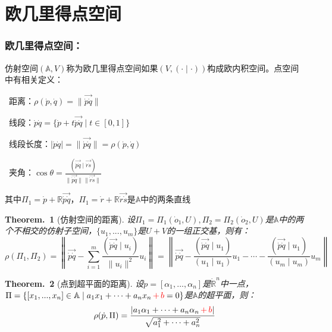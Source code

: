 \documentclass[zihao=5,UTF8]{report}
\def\R{\mathbb{R}}
\def\A{\mathbb{A}}
\theoremstyle{mystyle} %
\newtheorem{theorem}{Theorem.\,}
\begin{document}
\section{欧几里得点空间}

\subsubsection{欧几里得点空间：}
仿射空间$(\A,V)$称为欧几里得点空间如果$(V,(\cdot\mid\cdot))$构成欧内积空间。点空间中有相关定义：
\par{}\ 距离：$\rho(\dot{p}, \dot{q}) = \|\overrightarrow{\dot{p}\dot{q}}\|$    \par
{}\  线段：$\dot{p}\dot{q} = \{\dot{p} + t\overrightarrow{\dot{p}\dot{q}}\mid t \in [0,1]\}$   \par
{}\  线段长度：$|\dot{p}\dot{q}| =\|\overrightarrow{\dot{p}\dot{q}}\|= \rho(\dot{p}, \dot{q}) $   \par
{}\ 夹角：$\cos \theta = \frac{(\overrightarrow{\dot{p}\dot{q}}\mid \overrightarrow{\dot{r}\dot{s}})}{\| \overrightarrow{\dot{p}\dot{q}} \| \| \overrightarrow{\dot{r}\dot{s}} \|}$
{\par\color{gray}\small
其中$\Pi_1 = \dot{p} + \R\overrightarrow{\dot{p}\dot{q}}$，$\Pi_1 = \dot{r} + \R\overrightarrow{\dot{r}\dot{s}}$是$\A$中的两条直线
\par}

\begin{theorem}[仿射空间的距离]\label{仿射空间的距离}
设$\Pi_1 = \Pi_1(\dot{o}_1,U), \Pi_2 = \Pi_2(\dot{o}_2,U)$是$\A$中的两个不相交的仿射子空间，$\{u_1,...,u_m\}$是$U+V$的一组正交基，则有：
\begin{equation*}
    \rho(\Pi_1,\Pi_2)= \left \|  \overrightarrow{\dot{p}\dot{q}} - \sum_{i=1}^{m}\frac{(\overrightarrow{\dot{p}\dot{q}}\mid u_i)}{\| u_i \|^2}u_i  \right \|=\left \| \overrightarrow{\dot{p}\dot{q}} - \frac{(\overrightarrow{\dot{p}\dot{q}}\mid u_1)}{(u_1\mid u_1)}u_1 - \cdots -   \frac{(\overrightarrow{\dot{p}\dot{q}}\mid u_1)}{(u_m\mid u_m)}u_m \right \|
\end{equation*}
\end{theorem}

\begin{theorem}[点到超平面的距离]\label{点到超平面的距离}
设$\dot{p} = [\alpha_1,...,\alpha_n]$是$\dot{\R}^n$中一点，$\Pi = \{[x_1,...,x_n]\in \A \mid a_1x_1 + \cdots + a_nx_n \textcolor{red}{\,+\,b} = 0 \}$是$\A$的超平面，则：
\begin{equation*}
    \rho(\dot{p},\Pi) = \frac{\left| a_1\alpha_1 + \cdots +a_n\alpha_n \textcolor{red}{\,+\,b}\right| }{\sqrt{a_1^2+\cdots+a_n^2}}
\end{equation*}
\end{theorem}
\end{document}
